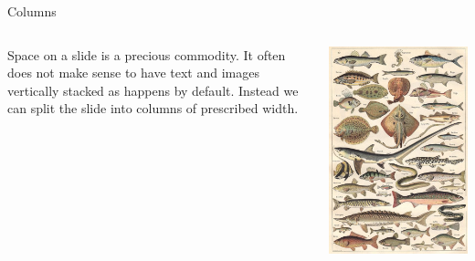 \documentclass{beamer}
\begin{document}
\begin{frame}{Columns} 
    \begin{columns}[T]  %
        \begin{column}{.5\textwidth}    %
            Space on a slide is a precious commodity.
            It often does not make sense to have text and images vertically stacked as happens by default. 
            Instead we can split the slide into columns of prescribed width.
        \end{column}
        
        \begin{column}{.5\textwidth}
            \includegraphics[scale=.25]{figs/species4.jpg}
        \end{column}

    \end{columns}
\end{frame}
\end{document}

